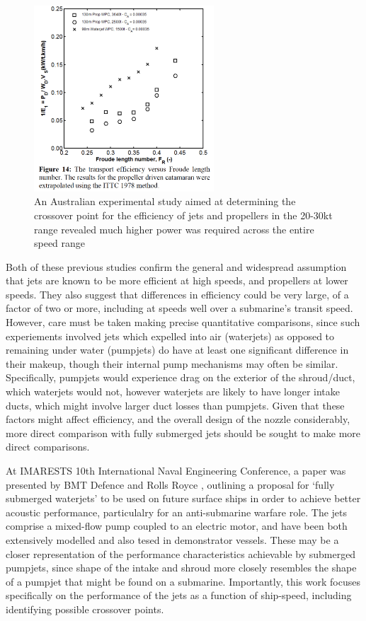 \documentclass{article}\usepackage[]{graphicx}\usepackage[]{color}
\begin{document}
\begin{figure}[h]
\captionsetup{width=0.6\textwidth}
\includegraphics[width=0.6\textwidth, center]{EfficiencyTransport.png}
\caption{An Australian experimental study aimed at determining the crossover point for the efficiency of jets and propellers in the 20-30kt range revealed much higher power was required across the entire speed range \parencite{kamal2015}}
\label{fig:EfficiencyTransport.png}
\end{figure}

Both of these previous studies confirm the general and widespread assumption that jets are known to be more efficient at high speeds, and propellers at lower speeds.  They also suggest that differences in efficiency could be very large, of a factor of two or more, including at speeds well over a submarine's transit speed.  However, care must be taken making precise quantitative comparisons, since such experiements involved jets which expelled into air (waterjets) as opposed to remaining under water (pumpjets) do have at least one significant difference in their makeup, though their internal pump mechanisms may often be similar. Specifically, pumpjets would experience drag on the exterior of the shroud/duct, which waterjets would not, however waterjets are likely to have longer intake ducts, which might involve larger duct losses than pumpjets.  Given that these factors might affect efficiency, and the overall design of the nozzle considerably, more direct comparison with fully submerged jets should be sought to make more direct comparisons.

At IMARESTS 10th International Naval Engineering Conference, a paper was presented by BMT Defence and Rolls Royce \parencite{giles2010}, outlining a proposal for `fully submerged waterjets' to be used on future surface ships in order to achieve better acoustic performance, particulalry for an anti-submarine warfare role. The jets comprise a mixed-flow pump coupled to an electric motor, and have been both extensively modelled and also tesed in demonstrator vessels.  These may be a closer representation of the performance characteristics achievable by submerged pumpjets, since shape of the intake and shroud more closely resembles the shape of a pumpjet that might be found on a submarine.  Importantly, this work focuses specifically on the performance of the jets as a function of ship-speed, including identifying possible crossover points.
\end{document}
